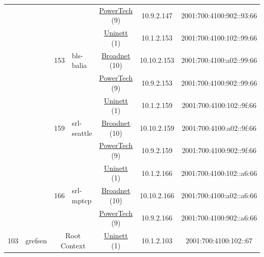 \begin{small}
\begin{center}
\begin{longtable}{|c|c|c|c|c|c|c|c|}
  &  &  &  & \multicolumn{2}{|c|}{\tiny{\href{http://www.powertech.no}{PowerTech} (9)}} & \tiny{10.9.2.147} & \tiny{2001:700:4100:902::93:66} \\* \cline{3-3}\cline{4-4}\cline{5-5}\cline{6-6}\cline{7-7}\cline{8-8}
  &  & \multirow{3}{*}{\tiny{153}} & \multicolumn{1}{|l|}{\multirow{3}{*}{\tiny{bls-balia}}} & \multicolumn{2}{|c|}{\tiny{\href{https://www.uninett.no}{Uninett} (1)}} & \tiny{10.1.2.153} & \tiny{2001:700:4100:102::99:66} \\* \cline{5-5}\cline{6-6}\cline{7-7}\cline{8-8}
  &  &  &  & \multicolumn{2}{|c|}{\tiny{\href{https://www.broadnet.no}{Broadnet} (10)}} & \tiny{10.10.2.153} & \tiny{2001:700:4100:a02::99:66} \\* \cline{5-5}\cline{6-6}\cline{7-7}\cline{8-8}
  &  &  &  & \multicolumn{2}{|c|}{\tiny{\href{http://www.powertech.no}{PowerTech} (9)}} & \tiny{10.9.2.153} & \tiny{2001:700:4100:902::99:66} \\* \cline{3-3}\cline{4-4}\cline{5-5}\cline{6-6}\cline{7-7}\cline{8-8}
  &  & \multirow{3}{*}{\tiny{159}} & \multicolumn{1}{|l|}{\multirow{3}{*}{\tiny{srl-seattle}}} & \multicolumn{2}{|c|}{\tiny{\href{https://www.uninett.no}{Uninett} (1)}} & \tiny{10.1.2.159} & \tiny{2001:700:4100:102::9f:66} \\* \cline{5-5}\cline{6-6}\cline{7-7}\cline{8-8}
  &  &  &  & \multicolumn{2}{|c|}{\tiny{\href{https://www.broadnet.no}{Broadnet} (10)}} & \tiny{10.10.2.159} & \tiny{2001:700:4100:a02::9f:66} \\* \cline{5-5}\cline{6-6}\cline{7-7}\cline{8-8}
  &  &  &  & \multicolumn{2}{|c|}{\tiny{\href{http://www.powertech.no}{PowerTech} (9)}} & \tiny{10.9.2.159} & \tiny{2001:700:4100:902::9f:66} \\* \cline{3-3}\cline{4-4}\cline{5-5}\cline{6-6}\cline{7-7}\cline{8-8}
  &  & \multirow{3}{*}{\tiny{166}} & \multicolumn{1}{|l|}{\multirow{3}{*}{\tiny{srl-mptcp}}} & \multicolumn{2}{|c|}{\tiny{\href{https://www.uninett.no}{Uninett} (1)}} & \tiny{10.1.2.166} & \tiny{2001:700:4100:102::a6:66} \\* \cline{5-5}\cline{6-6}\cline{7-7}\cline{8-8}
  &  &  &  & \multicolumn{2}{|c|}{\tiny{\href{https://www.broadnet.no}{Broadnet} (10)}} & \tiny{10.10.2.166} & \tiny{2001:700:4100:a02::a6:66} \\* \cline{5-5}\cline{6-6}\cline{7-7}\cline{8-8}
  &  &  &  & \multicolumn{2}{|c|}{\tiny{\href{http://www.powertech.no}{PowerTech} (9)}} & \tiny{10.9.2.166} & \tiny{2001:700:4100:902::a6:66} \\ \hline
 \multirow{21}{*}{\tiny{103}} & \multicolumn{1}{|l|}{\multirow{21}{*}{\tiny{grefsen}}} & \multicolumn{2}{|c|}{\multirow{3}{*}{\tiny{Root Context}}} & \multicolumn{2}{|c|}{\tiny{\href{https://www.uninett.no}{Uninett} (1)}} & \tiny{10.1.2.103} & \tiny{2001:700:4100:102::67} \\* \cline{5-5}\cline{6-6}\cline{7-7}\cline{8-8}

\end{longtable}
\end{center}
\end{small}

